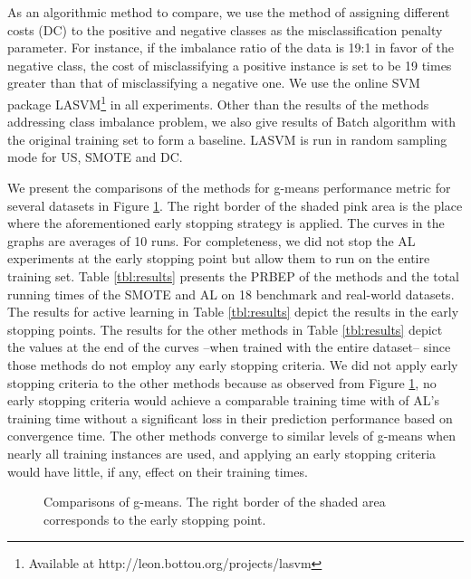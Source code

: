 As an algorithmic method to compare, we use the method of assigning different costs (DC) to the positive and negative classes as the misclassification penalty parameter. For instance, if the imbalance ratio of the data is 19:1 in favor of the negative class, the cost of misclassifying a positive instance is set to be 19 times greater than that of misclassifying a negative one. We use the online SVM package LASVM\footnote{Available at http://leon.bottou.org/projects/lasvm} in all experiments. Other than the results of the methods addressing class imbalance problem, we also give results of Batch algorithm with the original training set to form a baseline. LASVM is run in random sampling mode for US, SMOTE and DC.

We present the comparisons of the methods for g-means performance metric for several datasets in Figure \ref{eightgraphs}. The right border of the shaded pink area is the place where the aforementioned early stopping strategy is applied.  The curves in the graphs are averages of 10 runs. For completeness, we did not stop the AL experiments at the early stopping point but allow them to run on the entire training set. Table \ref{tbl:results} presents the PRBEP of the methods and the total running times of the SMOTE and AL on 18 benchmark and real-world datasets. The results for active learning in Table \ref{tbl:results} depict the results in the early stopping points. The results for the other methods in Table \ref{tbl:results} depict the values at the end of the curves --when trained with the entire dataset-- since those methods do not employ any early stopping criteria. We did not apply early stopping criteria to the other methods because as observed from Figure \ref{eightgraphs}, no early stopping criteria would achieve a comparable training time with of AL's training time without a significant loss in their prediction performance based on convergence time. The other methods converge to similar levels of g-means when nearly all training instances are used, and applying an early stopping criteria would have little, if any, effect on their training times.

\begin{figure}[t]
    \hspace{-5mm}
    \caption{Comparisons of g-means. The right border of the shaded area corresponds to the early stopping point.}
    \label{eightgraphs}
\end{figure}

